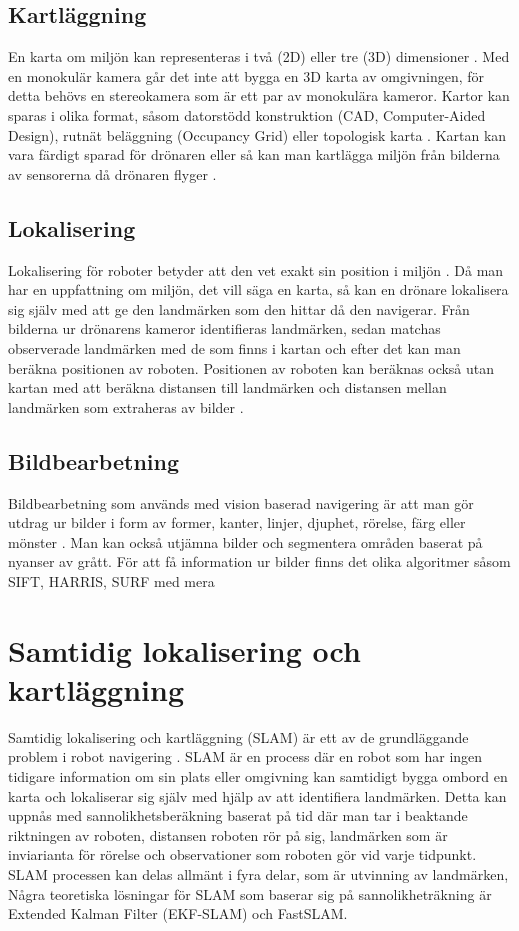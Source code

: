 \section{Kartläggning}

En karta om miljön kan representeras i två (2D) eller tre (3D) dimensioner \citep{geospatial}. Med en monokulär kamera går det inte att bygga en 3D karta av omgivningen, för detta behövs en stereokamera som är ett par av monokulära kameror. Kartor kan sparas i olika format, såsom datorstödd konstruktion (CAD, Computer-Aided Design), rutnät beläggning (Occupancy Grid) eller topologisk karta \citep{982903}. Kartan kan vara färdigt sparad för drönaren eller så kan man kartlägga miljön från bilderna av sensorerna då drönaren flyger \citep{geospatial}. 

\section{Lokalisering}

Lokalisering för roboter betyder att den vet exakt sin position i miljön \citep{982903}. Då man har en uppfattning om miljön, det vill säga en karta, så kan en drönare lokalisera sig själv med att ge den landmärken som den hittar då den navigerar. Från bilderna ur drönarens kameror identifieras landmärken, sedan matchas observerade landmärken med de som finns i kartan och efter det kan man beräkna positionen av roboten. Positionen av roboten kan beräknas också utan kartan med att beräkna distansen till landmärken och distansen mellan landmärken som extraheras av bilder \citep{realslamproblem}.

\section{Bildbearbetning}

Bildbearbetning som används med vision baserad navigering är att man gör utdrag ur bilder i form av former, kanter, linjer, djuphet, rörelse, färg eller mönster \citep{982903}. Man kan också utjämna bilder och segmentera områden baserat på nyanser av grått. För att få information ur bilder finns det olika algoritmer såsom SIFT, HARRIS, SURF med mera \citep{8930783}

\chapter{Samtidig lokalisering och kartläggning}

Samtidig lokalisering och kartläggning (SLAM) är ett av de grundläggande problem i robot navigering \citep{realslamproblem}. SLAM är en process där en robot som har ingen tidigare information om sin plats eller omgivning kan samtidigt bygga ombord en karta och lokaliserar sig själv med hjälp av att identifiera landmärken. Detta kan uppnås med sannolikhetsberäkning baserat på tid där man tar i beaktande riktningen av roboten, distansen roboten rör på sig, landmärken som är inviarianta för rörelse och observationer som roboten gör vid varje tidpunkt. SLAM processen kan delas allmänt i fyra delar, som är utvinning av landmärken, Några teoretiska lösningar för SLAM som baserar sig på sannolikheträkning är Extended Kalman Filter (EKF-SLAM) och FastSLAM. 

